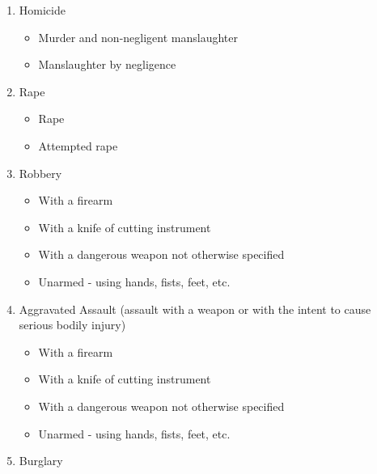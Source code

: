 \documentclass[
  12pt,
  openany]{book}
\providecommand{\tightlist}{%
  \setlength{\itemsep}{0pt}\setlength{\parskip}{0pt}}
\begin{document}
\begin{enumerate}
\def\labelenumi{\arabic{enumi}.}
\tightlist
\item
  Homicide

  \begin{itemize}
  \tightlist
  \item
    Murder and non-negligent manslaughter\\
  \item
    Manslaughter by negligence
  \end{itemize}
\item
  Rape

  \begin{itemize}
  \tightlist
  \item
    Rape\\
  \item
    Attempted rape\\
  \end{itemize}
\item
  Robbery

  \begin{itemize}
  \tightlist
  \item
    With a firearm\\
  \item
    With a knife of cutting instrument\\
  \item
    With a dangerous weapon not otherwise specified\\
  \item
    Unarmed - using hands, fists, feet, etc.\\
  \end{itemize}
\item
  Aggravated Assault (assault with a weapon or with the intent to cause serious bodily injury)

  \begin{itemize}
  \tightlist
  \item
    With a firearm\\
  \item
    With a knife of cutting instrument\\
  \item
    With a dangerous weapon not otherwise specified\\
  \item
    Unarmed - using hands, fists, feet, etc.\\
  \end{itemize}
\item
  Burglary


\end{enumerate}
\end{document}
